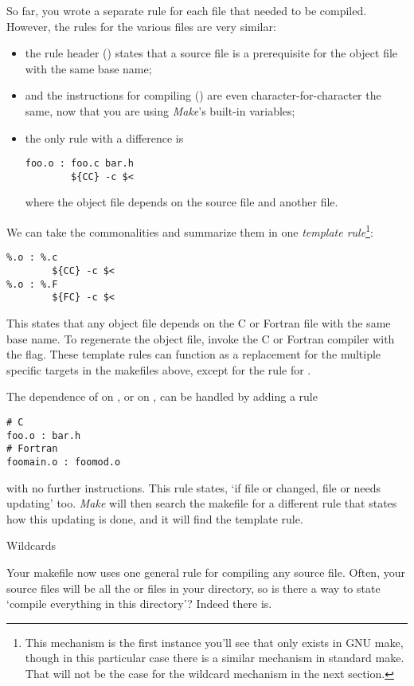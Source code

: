 So far, you wrote a separate rule for each file that
needed to be compiled. However, the rules for the various 
files are very similar:
\begin{itemize}
\item the rule header () states that a source file is a
  prerequisite for the object file with the same base name;
\item and the instructions for compiling () 
  are even character-for-character the
  same, now that you are using \emph{Make}'s built-in variables;
\item the only rule with a difference is 
\begin{verbatim}
foo.o : foo.c bar.h
        ${CC} -c $<
\end{verbatim}
  where the object file depends on the source file and another file.
\end{itemize}
We can take the commonalities and summarize them in one 
\emph{template rule}\footnote
{This mechanism is the first instance you'll see that only exists in
  GNU make, though in this particular case there is a similar
  mechanism in standard make. That will not be the case for the
  wildcard mechanism in the next section.}:
\begin{verbatim}
%.o : %.c
        ${CC} -c $<
%.o : %.F
        ${FC} -c $<
\end{verbatim}
This states that any object file depends on the C or Fortran file with
the same base name. To regenerate the object file, invoke the C or
Fortran compiler with the  flag.
These template rules can function as a replacement for the multiple
specific targets in the makefiles above, except for the rule for .

The dependence of  on , or  on
, can be handled by adding a rule
\begin{verbatim}
# C
foo.o : bar.h
# Fortran
foomain.o : foomod.o
\end{verbatim}
with no further instructions. This rule states, `if file
 or  changed, file  or 
needs updating' too. \emph{Make} will
then search the makefile for a different
rule that states how this updating is done, and it will find the
template rule.


 {Wildcards}

Your makefile now uses one general rule for compiling any source
file. Often, your source files will be all the  or 
files in your directory, so is there a way to state `compile
everything in this directory'? Indeed there is.


